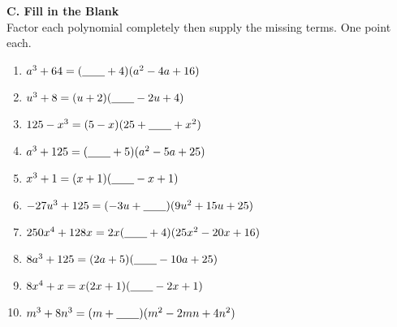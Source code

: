     \vspace*{1.3ex}
    
    \noindent \textbf{C. Fill in the Blank} \\
    
    Factor each polynomial completely then supply the missing terms. One point each.
    
    \begin{enumerate}
    		\item $ a^3 + 64 = (\underline{\hspace{2em}} + 4)(a^2 - 4a + 16) $
    		\item $ u^3 + 8 = (u + 2)(\underline{\hspace{2em}} - 2u + 4) $
    		\item $ 125 - x^3 = (5 - x)(25 + \underline{\hspace{2em}} + x^2) $
    		\item $ a^3 + 125 = (\underline{\hspace{2em}} + 5)(a^2 - 5a + 25) $
    		\item $ x^3 + 1 = (x + 1) (\underline{\hspace{2em}} - x + 1) $
    		\item $ -27u^3 + 125 = (-3u + \underline{\hspace{2em}}) (9u^2 + 15u + 25) $
    		\item $ 250x^4 + 128x = 2x(\underline{\hspace{2em}} + 4) (25x^2 - 20x + 16) $
    		\item $ 8a^3 + 125 = (2a + 5) (\underline{\hspace{2em}} - 10a + 25) $
    		\item $ 8x^4 + x = x(2x + 1) (\underline{\hspace{2em}} - 2x + 1) $
    		\item $ m^3 + 8n^3 = (m + \underline{\hspace{2em}}) (m^2 - 2mn + 4n^2) $
    \end{enumerate}

    \newpage
    
